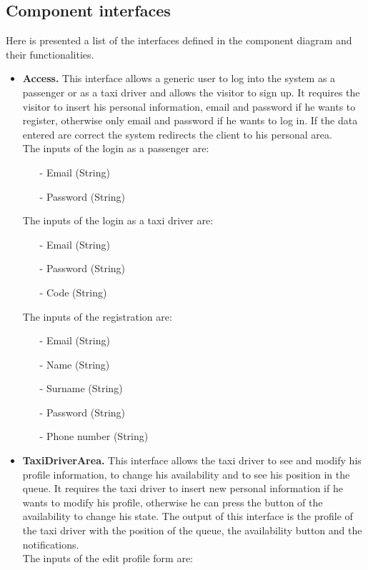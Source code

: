 	\subsection{Component interfaces}
	Here is presented a list of the interfaces defined in the component diagram and their functionalities.
	\begin{itemize}
		\item \textbf{Access.}
		This interface allows a generic user to log into the system as a passenger or as a taxi driver and allows the visitor to sign up. It requires the visitor to insert his personal information, email and password if he wants to register, otherwise only email and password if he wants to log in. If the data entered are correct the system redirects the client to his personal area.\\ The inputs of the login as a passenger are:
		\begin{itemize} 
			\item[-] Email (String)
			\item[-] Password (String)
		\end{itemize}
		The inputs of the login as a taxi driver are:
		\begin{itemize} 
			\item[-] Email (String)
			\item[-] Password (String)
			\item[-] Code (String)
		\end{itemize} 
		The inputs of the registration are:
		\begin{itemize} 
			\item[-] Email (String)
			\item[-] Name (String)
			\item[-] Surname (String)
			\item[-] Password (String)
			\item[-] Phone number (String)
		\end{itemize}
		\item \textbf{TaxiDriverArea.}
		This interface allows the taxi driver to see and modify his profile information, to change his availability and to see his position in the queue. It requires the taxi driver to insert new personal information if he wants to modify his profile, otherwise he can press the button of the availability to change his state. The output of this interface is the profile of the taxi driver with the position of the queue, the availability button and the notifications.\\ The inputs of the edit profile form are:

\end{itemize}
